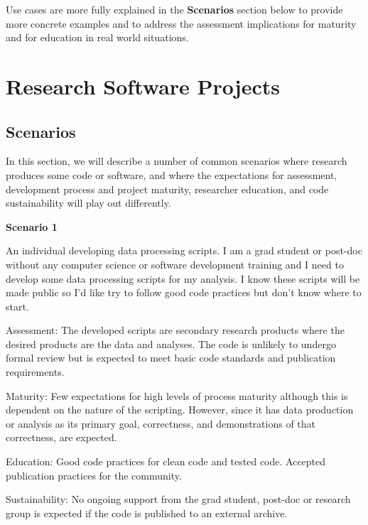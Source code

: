 \documentclass{article}
\begin{document}
Use cases are more fully explained in the \textbf{Scenarios} section below to provide more concrete examples and to address the assessment implications for maturity and for education in real world situations.

\section{Research Software Projects}
\subsection{Scenarios}
In this section, we will describe a number of common scenarios where research produces some code or software, and where the expectations for assessment, development process and project maturity, researcher education, and code sustainability will play out differently. 

\textbf{Scenario 1}
\begin{adjustwidth}{1cm}{0cm}
An individual developing data processing scripts. 
I am a grad student or post-doc without any computer science or software development training and I need to develop some data processing scripts for my analysis. I know these scripts will be made public so I’d like try to follow good code practices but don’t know where to start.
 
Assessment: The developed scripts are secondary research products where the desired products are the data and analyses. The code is unlikely to undergo formal review but is expected to meet basic code standards and publication requirements.
 
Maturity: Few expectations for high levels of process maturity although this is dependent on the nature of the scripting. However, since it has data production or analysis as its primary goal, correctness, and demonstrations of that correctness, are expected. 
 
Education: Good code practices for clean code and tested code. Accepted publication practices for the community. 
 
Sustainability: No ongoing support from the grad student, post-doc or research group is expected if the code is published to an external archive. 
\end{adjustwidth}
\end{document}
